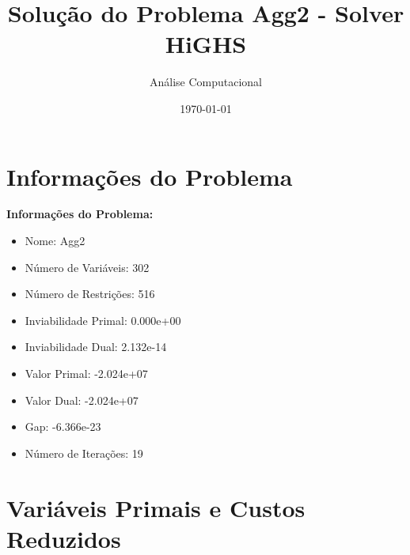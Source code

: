 \documentclass[12pt]{article}
\title{Solução do Problema Agg2 - Solver HiGHS}
\author{Análise Computacional}
\date{\today}
\begin{document}
\maketitle

\section{Informações do Problema}

\textbf{Informações do Problema:}
\begin{itemize}
\item Nome: Agg2
\item Número de Variáveis: 302
\item Número de Restrições: 516
\item Inviabilidade Primal: 0.000e+00
\item Inviabilidade Dual: 2.132e-14
\item Valor Primal: -2.024e+07
\item Valor Dual: -2.024e+07
\item Gap: -6.366e-23
\item Número de Iterações: 19
\end{itemize}


\section{Variáveis Primais e Custos Reduzidos}
\end{document}
